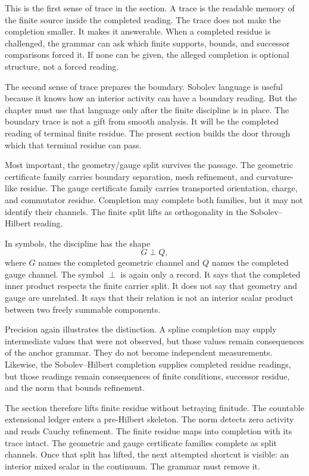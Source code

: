 This is the first sense of trace in the section. A trace is the readable
memory of the finite source inside the completed reading. The trace does not
make the completion smaller. It makes it answerable. When a completed
residue is challenged, the grammar can ask which finite supports, bounds,
and successor comparisons forced it. If none can be given, the alleged
completion is optional structure, not a forced reading.

The second sense of trace prepares the boundary. Sobolev language is useful
because it knows how an interior activity can have a boundary reading. But
the chapter must use that language only after the finite discipline is in
place. The boundary trace is not a gift from smooth analysis. It will be the
completed reading of terminal finite residue. The present section builds the
door through which that terminal residue can pass.

Most important, the geometry/gauge split survives the passage. The geometric
certificate family carries boundary separation, mesh refinement, and
curvature-like residue. The gauge certificate family carries transported
orientation, charge, and commutator residue. Completion may complete both
families, but it may not identify their channels. The finite split lifts as
orthogonality in the Sobolev--Hilbert reading.

In symbols, the discipline has the shape
\[
  G \perp Q,
\]
where \(G\) names the completed geometric channel and \(Q\) names the
completed gauge channel. The symbol \(\perp\) is again only a record. It
says that the completed inner product respects the finite carrier split. It
does not say that geometry and gauge are unrelated. It says that their
relation is not an interior scalar product between two freely summable
components.

Precision again illustrates the distinction. A spline completion may supply
intermediate values that were not observed, but those values remain
consequences of the anchor grammar. They do not become independent
measurements. Likewise, the Sobolev--Hilbert completion supplies completed
residue readings, but those readings remain consequences of finite
conditions, successor residue, and the norm that bounds refinement.

The section therefore lifts finite residue without betraying finitude. The
countable extensional ledger enters a pre-Hilbert skeleton. The norm detects
zero activity and reads Cauchy refinement. The finite residue maps into
completion with its trace intact. The geometric and gauge certificate
families complete as split channels. Once that split has lifted, the next
attempted shortcut is visible: an interior mixed scalar in the continuum.
The grammar must remove it.

